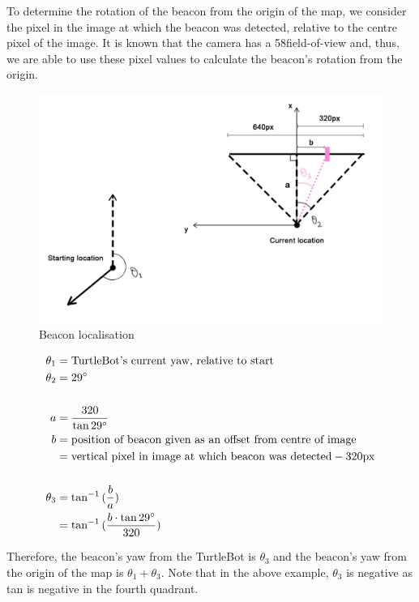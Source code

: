 \documentclass[titlepage,12pt,a4paper]{article}
\begin{document}
To determine the rotation of the beacon from the origin of the map, we consider the pixel in the image at which the beacon was detected, relative to the centre pixel of the image. It is known that the camera has a 58\degree field-of-view and, thus, we are able to use these pixel values to calculate the beacon's rotation from the origin. 

\begin{figure}[h]
	\includegraphics[scale=0.3]{beacon.jpg}
	\caption{Beacon localisation}
\end{figure}

\begin{align*}
	\theta_1   &=  \text{TurtleBot's current yaw, relative to start} \\
	\theta_2   &=  29\degree \\
	\\
	a 	        &=  \frac{320}{\tan{29\degree}} \\ 
	b 	        &=  \text{position of beacon given as an offset from centre of image} \\
			&=  \text{vertical pixel in image at which beacon was detected} - 320\text{px} \\
	\\
	\theta_3   &= \tan^{-1}{(\frac{b}{a})} \\
		        &= \tan^{-1}{(\frac{b \cdot \tan{29\degree}}{320})} 
\end{align*}

Therefore, the beacon's yaw from the TurtleBot is $\theta_3$ and the beacon's yaw from the origin of the map is $\theta_1 + \theta_3$. Note that in the above example, $\theta_3$ is negative as tan is negative in the fourth quadrant.
\end{document}
